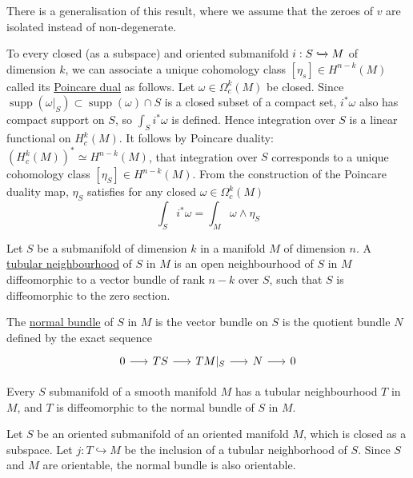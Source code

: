 There is a generalisation of this result, where we assume that the zeroes
of $v$ are isolated instead of non-degenerate.\cite[Theorem 1.58]{bgv} 

To every closed (as a subspace) and oriented submanifold $i: S
\xhookrightarrow{} M$ of dimension  $k$, we can
associate a unique cohomology class  $[\eta_s]\in H^{n-k}(M)$ called its
\underline{Poincare dual} as follows. Let $\omega\in \Omega_c^k(M)$ be closed.
Since $\operatorname{supp}(\omega|_S) \subset \operatorname{supp}(\omega) \cap
S$ is a closed subset of a compact set, $i^*\omega$ also has compact support on
$S$, so  $\int_S i^*\omega$ is defined. Hence integration over  $S$ is a  
linear functional on $H^k_c(M)$. It follows by Poincare duality:
$(H_c^k(M))^*\simeq H^{n-k}(M)$, that integration over $S$ corresponds to a
unique cohomology class $[\eta_S]\in H^{n-k}(M)$. 
From the construction of the Poincare duality map, $\eta_S$ satisfies
for any closed $\omega\in \Omega^k_c(M)$
\[
\int_S i^*\omega = \int_M \omega \wedge \eta_S
\] 
\begin{defn}
	Let $S$ be a submanifold of dimension  $k$ in a manifold  $M$ of dimension
	$n$. A \underline{tubular neighbourhood} of  $S$ in  $M$ is an open
	neighbourhood of  $S$ in  $M$ diffeomorphic to a vector bundle of rank
	$n-k$ over  $S$, such that  $S$ is diffeomorphic to the zero section.

	The \underline{normal bundle} of $S$ in  $M$ is the vector bundle on  $S$
	is the quotient bundle $N$ defined by the exact sequence 
	\[
	\begin{tikzcd}[column sep = 1.6em]
		0 \arrow[r] & TS \arrow[r] & TM|_S \arrow[r] 
						& N \arrow[r] & 0
	\end{tikzcd}
	\] 	
\end{defn}

\begin{thm} 
	Every $S$ submanifold of a smooth manifold $M$ has a 
	tubular neighbourhood  $T$ in $M$, and  
	$T$ is diffeomorphic to the normal bundle of $S$ in $M$.
\end{thm}

Let $S$ be an oriented submanifold of an oriented manifold $M$, which is closed
as a subspace. Let $j:T \hookrightarrow M$ be the inclusion
of a tubular neighborhood of  $S$. Since $S$ and  $M$ are orientable, the normal
bundle is also orientable. %


